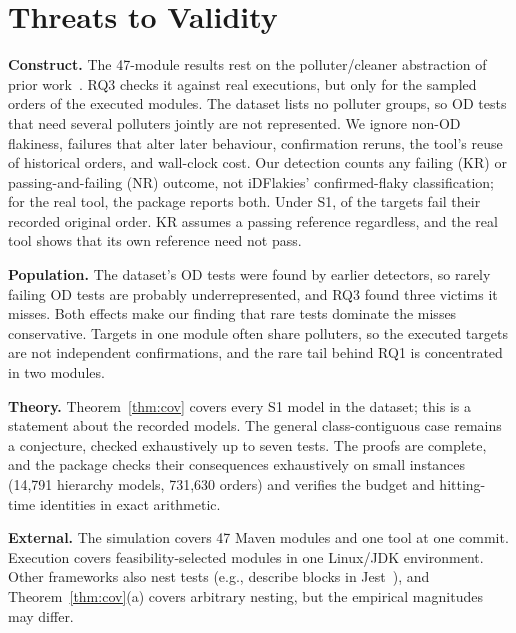 \documentclass[conference,letterpaper]{IEEEtran}
\theoremstyle{definition}
\begin{document}
\section{Threats to Validity}\label{sec:threats}
\textbf{Construct.} The 47-module results rest on the polluter/cleaner abstraction of prior work~\cite{wei2021tacas,li2023issta}. RQ3 checks it against real executions, but only for the sampled orders of the executed modules. The dataset lists no polluter groups, so OD tests that need several polluters jointly are not represented. We ignore non-OD flakiness, failures that alter later behaviour, confirmation reruns, the tool's reuse of historical orders, and wall-clock cost. Our detection counts any failing (KR) or passing-and-failing (NR) outcome, not iDFlakies' confirmed-flaky classification; for the real tool, the package reports both. Under S1, \NInconsistent{} of the \NTargets{} targets fail their recorded original order. KR assumes a passing reference regardless, and the real tool shows that its own reference need not pass.

\textbf{Population.} The dataset's OD tests were found by earlier detectors, so rarely failing OD tests are probably underrepresented, and RQ3 found three victims it misses. Both effects make our finding that rare tests dominate the misses conservative. Targets in one module often share polluters, so the \ExecAllTargets{} executed targets are not independent confirmations, and the rare tail behind RQ1 is concentrated in two modules.

\textbf{Theory.} Theorem~\ref{thm:cov} covers every S1 model in the dataset; this is a statement about the recorded models. The general class-contiguous case remains a conjecture, checked exhaustively up to seven tests. The proofs are complete, and the package checks their consequences exhaustively on small instances (14{,}791 hierarchy models, 731{,}630 orders) and verifies the budget and hitting-time identities in exact arithmetic.

\textbf{External.} The simulation covers 47 Maven modules and one tool at one commit. Execution covers feasibility-selected modules in one Linux/JDK environment. Other frameworks also nest tests (e.g., describe blocks in Jest~\cite{hashemi2025js}), and Theorem~\ref{thm:cov}(a) covers arbitrary nesting, but the empirical magnitudes may differ.
\end{document}
